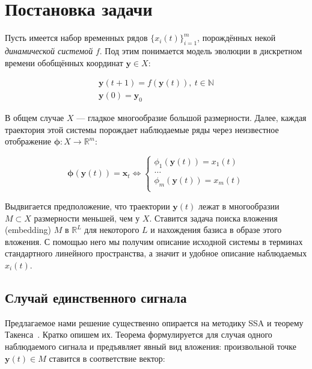 	\section{Постановка задачи}\label{sec:problem_statement}
		 
		 Пусть имеется набор временных рядов $ \{x_i(t)\}_{i=1}^m $, порождённых некой \emph{динамической системой} $f$. Под этим понимается модель эволюции в дискретном времени обобщённых координат $ \mathbf{y} \in X $:
		 	
		 \begin{gather*}
		 	\mathbf{y}(t + 1) = f(\mathbf{y}(t)), \ t \in \mathbb{N} \\
		 	\mathbf{y}(0) = \mathbf{y}_0
		 \end{gather*}
		 	
		 В общем случае $ X $ --- гладкое многообразие большой размерности. Далее, каждая траектория этой системы порождает наблюдаемые ряды через неизвестное отображение $ \boldsymbol{\phi}: X \to \mathbb{R}^m $:
		 	
		 \begin{equation*}
		 	\boldsymbol{\phi}(\mathbf{y}(t)) = \mathbf{x}_t \Leftrightarrow \begin{cases}
		 		\phi_1(\mathbf{y}(t)) = x_1(t) \\
		 		\ldots \\
		 		\phi_m(\mathbf{y}(t)) = x_m(t) \\
		 	\end{cases}
		 \end{equation*}
		 	
		 Выдвигается предположение, что траектории $ \mathbf{y}(t) $ лежат в многообразии $ M \subset X $ размерности меньшей, чем у $ X $. Ставится задача поиска вложения (embedding) $ M $ в $ \mathbb{R}^{L} $ для некоторого $ L $ и нахождения базиса в образе этого вложения. С помощью него мы получим описание исходной системы в терминах стандартного линейного пространства, а значит и удобное описание наблюдаемых $ x_i(t) $.
		 
		 \subsection{Случай единственного сигнала}
		 
		 	Предлагаемое нами решение существенно опирается на методику SSA и теорему Такенса~\cite{citeulike:2735031}. Кратко опишем их. Теорема формулируется для случая одного наблюдаемого сигнала и предъявляет явный вид вложения: произвольной точке $ \mathbf{y}(t) \in M $ ставится в соответствие вектор:
		 	
